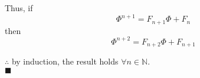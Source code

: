 \documentclass[a4paper,12pt]{article} %
\begin{document}
\begin{enumerate}
\begin{enumerate}
\begin{enumerate}
            Thus, if
              $$\Phi^{n+1} = F_{n+1}\Phi + F_{n}$$
            then
              $$\Phi^{n+2} = F_{n+2}\Phi + F_{n+1}$$

            $\therefore$ by induction, the result holds $\forall n \in \mathbb{N}$.\\
            $\blacksquare$
        \end{enumerate}
    \end{enumerate}
\end{enumerate}
\end{document}
